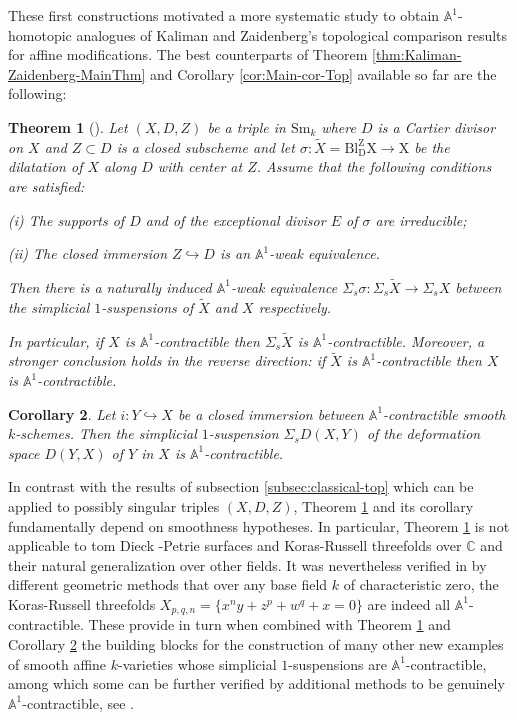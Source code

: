 \documentclass[10pt]{alggeom}
\newtheorem{thm}{Theorem}[section]
\newtheorem{cor}[thm]{Corollary}
\theoremstyle{definition}
\numberwithin{equation}{section}
\begin{document}
\vspace{0.1cm} 

These first constructions motivated a more systematic study to obtain
$\mathbb{A}^{1}$-homotopic analogues of Kaliman and Zaidenberg's
topological comparison results for affine modifications. The best
counterparts of Theorem \ref{thm:Kaliman-Zaidenberg-MainThm} and
Corollary \ref{cor:Main-cor-Top} available so far are the following:
\begin{thm}[{\cite[Theorem 2.17]{DP019}}]
\label{thm:A1-Homotopical-KZ}Let $(X,D,Z)$ be a triple in $\mathrm{Sm}_{k}$
where $D$ is a Cartier divisor on $X$ and $Z\subset D$ is a closed
subscheme and let $\sigma:\tilde{X}=\mathrm{Bl_{D}^{Z}X\to X}$ be
the dilatation of $X$ along $D$ with center at $Z$. Assume that
the following conditions are satisfied:

(i) The supports of $D$ and of the exceptional divisor $E$ of $\sigma$
are irreducible;

(ii) The closed immersion $Z\hookrightarrow D$ is an $\mathbb{A}^{1}$-weak
equivalence. 

\noindent Then there is a naturally induced $\mathbb{A}^{1}$-weak
equivalence $\Sigma_{s}\sigma:\Sigma_{s}\tilde{X}\to\Sigma_{s}X$
between the simplicial $1$-suspensions of $\tilde{X}$ and $X$ respectively. 

In particular, if $X$ is $\mathbb{A}^{1}$-contractible then $\Sigma_{s}\tilde{X}$
is $\mathbb{A}^{1}$-contractible. Moreover, a stronger conclusion
holds in the reverse direction: if $\tilde{X}$ is $\mathbb{A}^{1}$-contractible
then $X$ is $\mathbb{A}^{1}$-contractible. 
\end{thm}

\begin{cor}
\label{cor:DefSpace-A1-Cor}Let $i:Y\hookrightarrow X$ be a closed
immersion between $\mathbb{A}^{1}$-contractible smooth $k$-schemes.
Then the simplicial $1$-suspension $\Sigma_{s}D(X,Y)$ of the deformation
space $D(Y,X)$ of $Y$ in $X$ is $\mathbb{A}^{1}$-contractible. 
\end{cor}

In contrast with the results of subsection \ref{subsec:classical-top}
which can be applied to possibly singular triples $(X,D,Z)$, Theorem
\ref{thm:A1-Homotopical-KZ} and its corollary fundamentally depend
on smoothness hypotheses. In particular, Theorem \ref{thm:A1-Homotopical-KZ}
is not applicable to tom Dieck -Petrie surfaces and Koras-Russell
threefolds over $\mathbb{C}$ and their natural generalization over
other fields. It was nevertheless verified in \cite{DF18} by different
geometric methods that over any base field $k$ of characteristic
zero, the Koras-Russell threefolds $X_{p,q,n}=\{x^{n}y+z^{p}+w^{q}+x=0\}$
are indeed all $\mathbb{A}^{1}$-contractible. These provide in turn
when combined with Theorem \ref{thm:A1-Homotopical-KZ} and Corollary
\ref{cor:DefSpace-A1-Cor} the building blocks for the construction
of many other new examples of smooth affine $k$-varieties whose simplicial
$1$-suspensions are $\mathbb{A}^{1}$-contractible, among which some
can be further verified by additional methods to be genuinely $\mathbb{A}^{1}$-contractible,
see \cite[Section 4]{DP019}.
\end{document}
